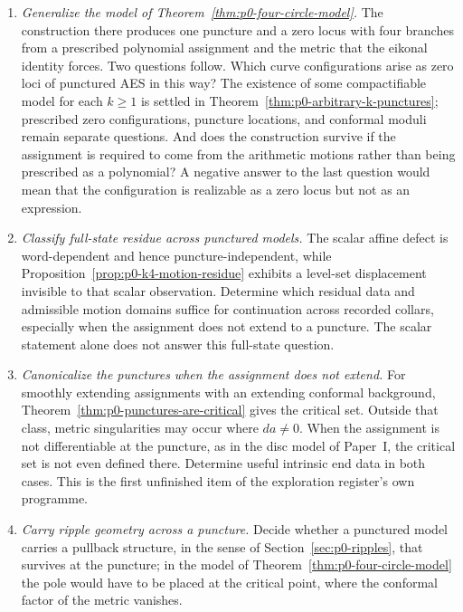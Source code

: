 \begin{enumerate}
  \item \label{op:p0-four-circle}\emph{Generalize the model of
  Theorem~\ref{thm:p0-four-circle-model}.}  The construction there produces one
  puncture and a zero locus with four branches from a prescribed polynomial
  assignment and the metric that the eikonal identity forces.  Two questions
  follow.  Which curve configurations arise as zero loci of punctured AES in this
  way?  The existence of some compactifiable model for each $k\ge1$ is settled
  in Theorem~\ref{thm:p0-arbitrary-k-punctures}; prescribed zero configurations,
  puncture locations, and conformal moduli remain separate questions.  And does the construction survive if the
  assignment is required to come from the arithmetic motions rather than being
  prescribed as a polynomial?  A negative answer to the last question would mean
  that the configuration is realizable as a zero locus but not as an expression.
  \item \label{op:p0-canonical-punctures}\emph{Classify full-state residue across
  punctured models.}  The scalar affine defect is word-dependent and hence
  puncture-independent, while Proposition~\ref{prop:p0-k4-motion-residue}
  exhibits a level-set displacement invisible to that scalar observation.
  Determine which residual data and admissible motion domains suffice for
  continuation across recorded collars, especially when the assignment does
  not extend to a puncture.  The scalar statement alone does not answer this
  full-state question.
  \item \emph{Canonicalize the punctures when the assignment does not extend.}
  For smoothly extending assignments with an extending conformal background,
  Theorem~\ref{thm:p0-punctures-are-critical} gives the critical set.  Outside
  that class, metric singularities may occur where $da\ne0$.  When the
  assignment is not differentiable at the puncture, as in the disc model of
  Paper~I, the critical set is not even defined there.  Determine useful
  intrinsic end data in both cases.  This is the first
  unfinished item of the exploration register's own programme.
  \item \emph{Carry ripple geometry across a puncture.}  Decide whether a
  punctured model carries a pullback structure, in the sense of
  Section~\ref{sec:p0-ripples}, that survives at the puncture; in the model of
  Theorem~\ref{thm:p0-four-circle-model} the pole would have to be placed at the
  critical point, where the conformal factor of the metric vanishes.
\end{enumerate}


